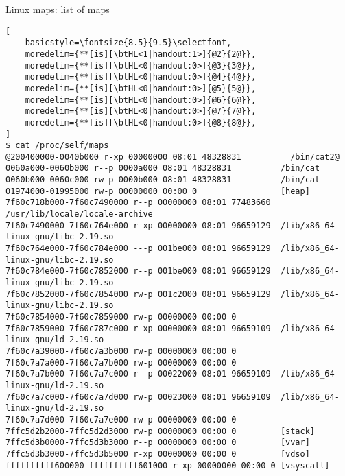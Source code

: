 \begin{frame}[fragile,label=linuxMapsAreaStruct]{Linux maps: list of maps}
\lstset{language=}
\begin{lstlisting}[
    basicstyle=\fontsize{8.5}{9.5}\selectfont,
    moredelim={**[is][\btHL<1|handout:1>]{@2}{2@}},
    moredelim={**[is][\btHL<0|handout:0>]{@3}{3@}},
    moredelim={**[is][\btHL<0|handout:0>]{@4}{4@}},
    moredelim={**[is][\btHL<0|handout:0>]{@5}{5@}},
    moredelim={**[is][\btHL<0|handout:0>]{@6}{6@}},
    moredelim={**[is][\btHL<0|handout:0>]{@7}{7@}},
    moredelim={**[is][\btHL<0|handout:0>]{@8}{8@}},
]
$ cat /proc/self/maps
@200400000-0040b000 r-xp 00000000 08:01 48328831          /bin/cat2@
0060a000-0060b000 r--p 0000a000 08:01 48328831          /bin/cat
0060b000-0060c000 rw-p 0000b000 08:01 48328831          /bin/cat
01974000-01995000 rw-p 00000000 00:00 0                 [heap]
7f60c718b000-7f60c7490000 r--p 00000000 08:01 77483660  /usr/lib/locale/locale-archive
7f60c7490000-7f60c764e000 r-xp 00000000 08:01 96659129  /lib/x86_64-linux-gnu/libc-2.19.so
7f60c764e000-7f60c784e000 ---p 001be000 08:01 96659129  /lib/x86_64-linux-gnu/libc-2.19.so
7f60c784e000-7f60c7852000 r--p 001be000 08:01 96659129  /lib/x86_64-linux-gnu/libc-2.19.so
7f60c7852000-7f60c7854000 rw-p 001c2000 08:01 96659129  /lib/x86_64-linux-gnu/libc-2.19.so
7f60c7854000-7f60c7859000 rw-p 00000000 00:00 0 
7f60c7859000-7f60c787c000 r-xp 00000000 08:01 96659109  /lib/x86_64-linux-gnu/ld-2.19.so
7f60c7a39000-7f60c7a3b000 rw-p 00000000 00:00 0 
7f60c7a7a000-7f60c7a7b000 rw-p 00000000 00:00 0 
7f60c7a7b000-7f60c7a7c000 r--p 00022000 08:01 96659109  /lib/x86_64-linux-gnu/ld-2.19.so
7f60c7a7c000-7f60c7a7d000 rw-p 00023000 08:01 96659109  /lib/x86_64-linux-gnu/ld-2.19.so
7f60c7a7d000-7f60c7a7e000 rw-p 00000000 00:00 0 
7ffc5d2b2000-7ffc5d2d3000 rw-p 00000000 00:00 0         [stack]
7ffc5d3b0000-7ffc5d3b3000 r--p 00000000 00:00 0         [vvar]
7ffc5d3b3000-7ffc5d3b5000 r-xp 00000000 00:00 0         [vdso]
ffffffffff600000-ffffffffff601000 r-xp 00000000 00:00 0 [vsyscall]
\end{lstlisting}
\end{frame}
